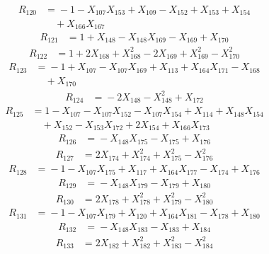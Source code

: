 \[\begin{aligned}
R_{120} &={}-1 - X_{107}X_{153} + X_{109} - X_{152} + X_{153} + X_{154}\\
&\quad{} + X_{166}X_{167}
\end{aligned}\]
\[\begin{aligned}
R_{121} &={}1 + X_{148} - X_{148}X_{169} - X_{169} + X_{170}
\end{aligned}\]
\[\begin{aligned}
R_{122} &={}1 + 2X_{168} + X_{168}^{2} - 2X_{169} + X_{169}^{2} - X_{170}^{2}
\end{aligned}\]
\[\begin{aligned}
R_{123} &={}-1 + X_{107} - X_{107}X_{169} + X_{113} + X_{164}X_{171} - X_{168}\\
&\quad{} + X_{170}
\end{aligned}\]
\[\begin{aligned}
R_{124} &={}-2X_{148} - X_{148}^{2} + X_{172}
\end{aligned}\]
\[\begin{aligned}
R_{125} &={}1 - X_{107} - X_{107}X_{152} - X_{107}X_{154} + X_{114} + X_{148}X_{154}\\
&\quad{} + X_{152} - X_{153}X_{172} + 2X_{154} + X_{166}X_{173}
\end{aligned}\]
\[\begin{aligned}
R_{126} &={}-X_{148}X_{175} - X_{175} + X_{176}
\end{aligned}\]
\[\begin{aligned}
R_{127} &={}2X_{174} + X_{174}^{2} + X_{175}^{2} - X_{176}^{2}
\end{aligned}\]
\[\begin{aligned}
R_{128} &={}-1 - X_{107}X_{175} + X_{117} + X_{164}X_{177} - X_{174} + X_{176}
\end{aligned}\]
\[\begin{aligned}
R_{129} &={}-X_{148}X_{179} - X_{179} + X_{180}
\end{aligned}\]
\[\begin{aligned}
R_{130} &={}2X_{178} + X_{178}^{2} + X_{179}^{2} - X_{180}^{2}
\end{aligned}\]
\[\begin{aligned}
R_{131} &={}-1 - X_{107}X_{179} + X_{120} + X_{164}X_{181} - X_{178} + X_{180}
\end{aligned}\]
\[\begin{aligned}
R_{132} &={}-X_{148}X_{183} - X_{183} + X_{184}
\end{aligned}\]
\[\begin{aligned}
R_{133} &={}2X_{182} + X_{182}^{2} + X_{183}^{2} - X_{184}^{2}
\end{aligned}\]
